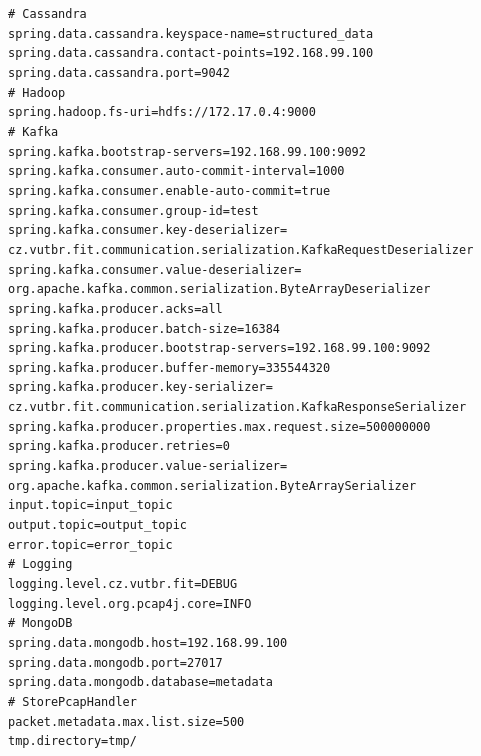 \vspace{0.5cm}
\noindent \texttt{\#   Cassandra \\
spring.data.cassandra.keyspace-name=structured\_data \\
spring.data.cassandra.contact-points=192.168.99.100 \\
spring.data.cassandra.port=9042 \\
\#   Hadoop \\
spring.hadoop.fs-uri=hdfs://172.17.0.4:9000 \\
\#   Kafka \\
spring.kafka.bootstrap-servers=192.168.99.100:9092 \\
spring.kafka.consumer.auto-commit-interval=1000 \\
spring.kafka.consumer.enable-auto-commit=true \\
spring.kafka.consumer.group-id=test \\
spring.kafka.consumer.key-deserializer= \\
\indent cz.vutbr.fit.communication.serialization.KafkaRequestDeserializer \\
spring.kafka.consumer.value-deserializer= \\
\indent org.apache.kafka.common.serialization.ByteArrayDeserializer \\
spring.kafka.producer.acks=all \\
spring.kafka.producer.batch-size=16384 \\
spring.kafka.producer.bootstrap-servers=192.168.99.100:9092 \\
spring.kafka.producer.buffer-memory=335544320 \\
spring.kafka.producer.key-serializer= \\
\indent cz.vutbr.fit.communication.serialization.KafkaResponseSerializer \\
spring.kafka.producer.properties.max.request.size=500000000 \\
spring.kafka.producer.retries=0 \\
spring.kafka.producer.value-serializer= \\
\indent org.apache.kafka.common.serialization.ByteArraySerializer \\
input.topic=input\_topic \\
output.topic=output\_topic \\
error.topic=error\_topic \\
\#   Logging \\
logging.level.cz.vutbr.fit=DEBUG \\
logging.level.org.pcap4j.core=INFO \\
\#   MongoDB \\
spring.data.mongodb.host=192.168.99.100 \\
spring.data.mongodb.port=27017 \\
spring.data.mongodb.database=metadata \\
\#   StorePcapHandler \\
packet.metadata.max.list.size=500 \\
tmp.directory=tmp/
}

